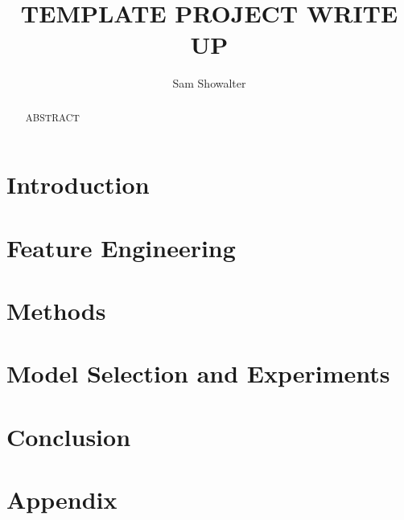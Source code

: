 \documentclass{cup-ino}
\title{TEMPLATE PROJECT WRITE UP}
\author{Sam Showalter}
\begin{document}
\maketitle

\begin{abstract}
ABSTRACT
\end{abstract}
\vspace{5mm}
\section{Introduction}



\vspace{2mm}
\section{Feature Engineering}



\vspace{2mm}
\section{Methods}





\vspace{2mm}
\section{Model Selection and Experiments}


\vspace{2mm}
\section{Conclusion}



\newpage




\newpage
\section{Appendix}
\end{document}
